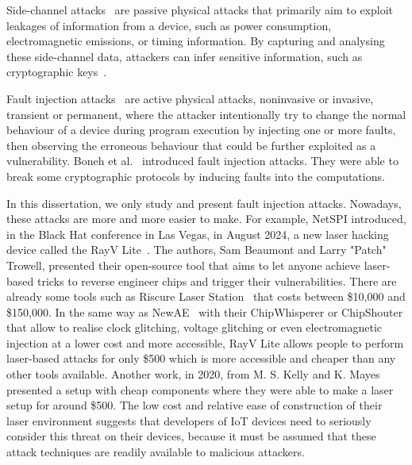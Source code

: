 Side-channel attacks~\cite{DM-21-appiot} are passive physical attacks that primarily aim to exploit leakages of information from a device, such as power consumption, electromagnetic emissions, or timing information. By capturing and analysing these side-channel data, attackers can infer sensitive information, such as cryptographic keys~\cite{K-96-crypto}.

Fault injection attacks~\cite{BCNTW-06-procieee, BBKN-12-procieee, YSW-18-hss} are active physical attacks, noninvasive or invasive, transient or permanent, where the attacker intentionally try to change the normal behaviour of a device during program execution by injecting one or more faults, then observing the erroneous behaviour that could be further exploited as a vulnerability. Boneh et al.~\cite{BDL-97-eurocrypt} introduced fault injection attacks. They were able to break some cryptographic protocols by inducing faults into the computations.

In this dissertation, we only study and present fault injection attacks. Nowadays, these attacks are more and more easier to make. For example, NetSPI introduced, in the Black Hat conference in Las Vegas, in August 2024, a new laser hacking device called the RayV Lite~\cite{rayvlite_wired}. The authors, Sam Beaumont and Larry "Patch" Trowell, presented their open-source tool that aims to let anyone achieve laser-based tricks to reverse engineer chips and trigger their vulnerabilities. There are already some tools such as Riscure Laser Station~\cite{riscure_station} that costs between \$10,000 and \$150,000. In the same way as NewAE~\cite{chipwhisperer, chipshouter} with their ChipWhisperer or ChipShouter that allow to realise clock glitching, voltage glitching or even electromagnetic injection at a lower cost and more accessible, RayV Lite allows people to perform laser-based attacks for only \$500 which is more accessible and cheaper than any other tools available. Another work, in 2020, from M. S. Kelly and K. Mayes~\cite{KM-20-host} presented a setup with cheap components where they were able to make a laser setup for around \$500. The low cost and relative ease of construction of their laser environment suggests that developers of IoT devices need to seriously consider this threat on their devices, because it must be assumed that these attack techniques are readily available to malicious attackers.

